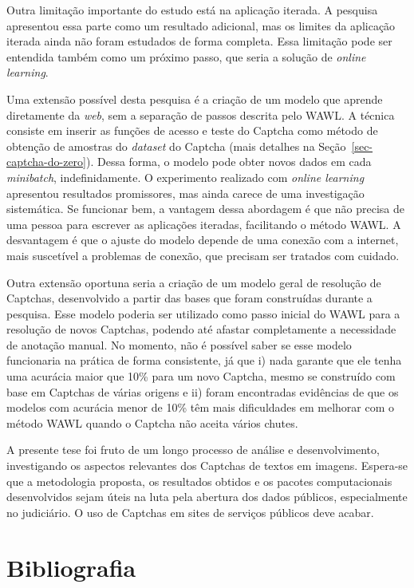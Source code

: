 \documentclass[12pt,twoside,brazilian]{book}
\begin{document}
Outra limitação importante do estudo está na aplicação iterada. A
pesquisa apresentou essa parte como um resultado adicional, mas os
limites da aplicação iterada ainda não foram estudados de forma
completa. Essa limitação pode ser entendida também como um próximo
passo, que seria a solução de \emph{online learning}.

Uma extensão possível desta pesquisa é a criação de um modelo que
aprende diretamente da \emph{web}, sem a separação de passos descrita
pelo WAWL. A técnica consiste em inserir as funções de acesso e teste do
Captcha como método de obtenção de amostras do \emph{dataset} do Captcha
(mais detalhes na Seção~\ref{sec-captcha-do-zero}). Dessa forma, o
modelo pode obter novos dados em cada \emph{minibatch}, indefinidamente.
O experimento realizado com \emph{online learning} apresentou resultados
promissores, mas ainda carece de uma investigação sistemática. Se
funcionar bem, a vantagem dessa abordagem é que não precisa de uma
pessoa para escrever as aplicações iteradas, facilitando o método WAWL.
A desvantagem é que o ajuste do modelo depende de uma conexão com a
internet, mais suscetível a problemas de conexão, que precisam ser
tratados com cuidado.

Outra extensão oportuna seria a criação de um modelo geral de resolução
de Captchas, desenvolvido a partir das bases que foram construídas
durante a pesquisa. Esse modelo poderia ser utilizado como passo inicial
do WAWL para a resolução de novos Captchas, podendo até afastar
completamente a necessidade de anotação manual. No momento, não é
possível saber se esse modelo funcionaria na prática de forma
consistente, já que i) nada garante que ele tenha uma acurácia maior que
10\% para um novo Captcha, mesmo se construído com base em Captchas de
várias origens e ii) foram encontradas evidências de que os modelos com
acurácia menor de 10\% têm mais dificuldades em melhorar com o método
WAWL quando o Captcha não aceita vários chutes.

A presente tese foi fruto de um longo processo de análise e
desenvolvimento, investigando os aspectos relevantes dos Captchas de
textos em imagens. Espera-se que a metodologia proposta, os resultados
obtidos e os pacotes computacionais desenvolvidos sejam úteis na luta
pela abertura dos dados públicos, especialmente no judiciário. O uso de
Captchas em sites de serviços públicos deve acabar.


\hypertarget{bibliografia}{%
\chapter*{Bibliografia}\label{bibliografia}}
\end{document}
